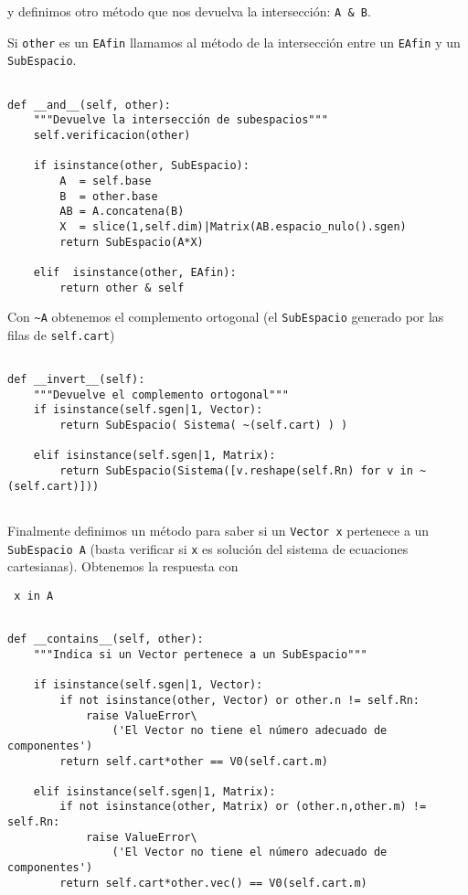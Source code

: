 \documentclass[11pt]{report}
\begin{document}
y definimos otro método que nos devuelva la intersección: \texttt{A \& B}. 

Si \texttt{other} es un \texttt{EAfin} llamamos al método de la intersección entre
un \texttt{EAfin} y un \texttt{SubEspacio}.

\begin{verbatim}

def __and__(self, other):
    """Devuelve la intersección de subespacios"""
    self.verificacion(other)
    
    if isinstance(other, SubEspacio):
        A  = self.base
        B  = other.base
        AB = A.concatena(B)
        X  = slice(1,self.dim)|Matrix(AB.espacio_nulo().sgen)
        return SubEspacio(A*X)
    
    elif  isinstance(other, EAfin):
        return other & self

\end{verbatim}

Con \texttt{\textasciitilde{}A} obtenemos el complemento ortogonal (el \texttt{SubEspacio} generado
por las filas de \texttt{self.cart})

\begin{verbatim}

def __invert__(self):
    """Devuelve el complemento ortogonal"""
    if isinstance(self.sgen|1, Vector):
        return SubEspacio( Sistema( ~(self.cart) ) )
    
    elif isinstance(self.sgen|1, Matrix):
        return SubEspacio(Sistema([v.reshape(self.Rn) for v in ~(self.cart)]))
    
\end{verbatim}

\noindent Finalmente definimos un método para saber si un \texttt{Vector x}
pertenece a un \texttt{SubEspacio A} (basta verificar si \texttt{x} es solución del
sistema de ecuaciones cartesianas). Obtenemos la respuesta con
\begin{center}
  \Verb/ x in A /
\end{center}

\begin{verbatim}

def __contains__(self, other):
    """Indica si un Vector pertenece a un SubEspacio"""

    if isinstance(self.sgen|1, Vector):
        if not isinstance(other, Vector) or other.n != self.Rn:
            raise ValueError\
                ('El Vector no tiene el número adecuado de componentes')
        return self.cart*other == V0(self.cart.m)
    
    elif isinstance(self.sgen|1, Matrix):
        if not isinstance(other, Matrix) or (other.n,other.m) != self.Rn:
            raise ValueError\
                ('El Vector no tiene el número adecuado de componentes')        
        return self.cart*other.vec() == V0(self.cart.m)
    

\end{verbatim}
\end{document}
